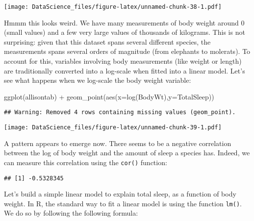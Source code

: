 \documentclass[
]{book}
\newenvironment{Shaded}{\begin{snugshade}}{\end{snugshade}}
\newcommand{\AttributeTok}[1]{\textcolor[rgb]{0.77,0.63,0.00}{#1}}
\newcommand{\FunctionTok}[1]{\textcolor[rgb]{0.00,0.00,0.00}{#1}}
\newcommand{\NormalTok}[1]{#1}
\newcommand{\SpecialCharTok}[1]{\textcolor[rgb]{0.00,0.00,0.00}{#1}}
\newcommand{\StringTok}[1]{\textcolor[rgb]{0.31,0.60,0.02}{#1}}
\begin{document}
\texttt{[image: DataScience\_files/figure-latex/unnamed-chunk-38-1.pdf]}

Hmmm this looks weird. We have many measurements of body weight around 0 (small values) and a few very large values of thousands of kilograms. This is not surprising: given that this dataset spans several different species, the measurements spans several orders of magnitude (from elephants to molerats). To account for this, variables involving body measurements (like weight or length) are traditionally converted into a log-scale when fitted into a linear model. Let's see what happens when we log-scale the body weight variable:

\begin{Shaded}
\begin{Highlighting}[]
\FunctionTok{ggplot}\NormalTok{(allisontab) }\SpecialCharTok{+} \FunctionTok{geom\_point}\NormalTok{(}\FunctionTok{aes}\NormalTok{(}\AttributeTok{x=}\FunctionTok{log}\NormalTok{(BodyWt),}\AttributeTok{y=}\NormalTok{TotalSleep))}
\end{Highlighting}
\end{Shaded}

\begin{verbatim}
## Warning: Removed 4 rows containing missing values (geom_point).
\end{verbatim}

\texttt{[image: DataScience\_files/figure-latex/unnamed-chunk-39-1.pdf]}

A pattern appears to emerge now. There seems to be a negative correlation between the log of body weight and the amount of sleep a species has. Indeed, we can measure this correlation using the \texttt{cor()} function:

\begin{Shaded}
\end{Shaded}

\begin{verbatim}
## [1] -0.5328345
\end{verbatim}

Let's build a simple linear model to explain total sleep, as a function of body weight. In R, the standard way to fit a linear model is using the function \texttt{lm()}. We do so by following the following formula:
\end{document}
